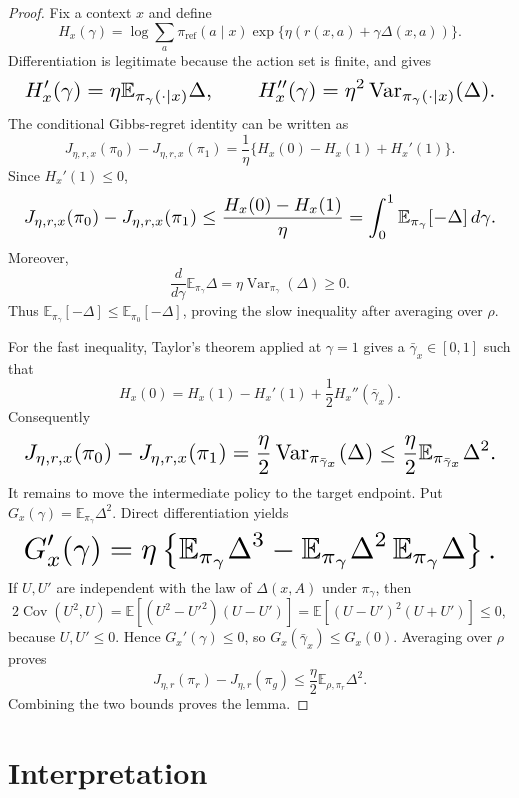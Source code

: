 \documentclass{article}
\begin{document}
\begin{proof}
Fix a context \(x\) and define
\[
H_x(\gamma)=\log\sum_a\pi_{\mathrm{ref}}(a\mid x)
\exp\{\eta(r(x,a)+\gamma\Delta(x,a))\}.
\]
Differentiation is legitimate because the action set is finite, and gives
\[
\makebox[\linewidth][c]{\resizebox{0.98\linewidth}{!}{\(\displaystyle H_x'(\gamma)=\eta\mathbb E_{\pi_\gamma(\cdot\mid x)}\Delta,
\qquad
H_x''(\gamma)=\eta^2\operatorname{Var}_{\pi_\gamma(\cdot\mid x)}(\Delta).\)}}
\]
The conditional Gibbs-regret identity can be written as
\[
J_{\eta,r,x}(\pi_0)-J_{\eta,r,x}(\pi_1)
=\frac1\eta\{H_x(0)-H_x(1)+H_x'(1)\}.
\]
Since \(H_x'(1)\le0\),
\[
\makebox[\linewidth][c]{\resizebox{0.98\linewidth}{!}{\(\displaystyle J_{\eta,r,x}(\pi_0)-J_{\eta,r,x}(\pi_1)
\le\frac{H_x(0)-H_x(1)}\eta
=\int_0^1\mathbb E_{\pi_\gamma}[-\Delta]\,d\gamma.\)}}
\]
Moreover,
\[
\frac{d}{d\gamma}\mathbb E_{\pi_\gamma}\Delta
=\eta\operatorname{Var}_{\pi_\gamma}(\Delta)\ge0.
\]
Thus \(\mathbb E_{\pi_\gamma}[-\Delta]\le\mathbb E_{\pi_0}[-\Delta]\), proving the slow inequality after averaging over \(\rho\).

For the fast inequality, Taylor's theorem applied at \(\gamma=1\) gives a \(\bar\gamma_x\in[0,1]\) such that
\[
H_x(0)=H_x(1)-H_x'(1)+\frac12H_x''(\bar\gamma_x).
\]
Consequently
\[
\makebox[\linewidth][c]{\resizebox{0.98\linewidth}{!}{\(\displaystyle J_{\eta,r,x}(\pi_0)-J_{\eta,r,x}(\pi_1)
=\frac\eta2\operatorname{Var}_{\pi_{\bar\gamma_x}}(\Delta)
\le\frac\eta2\mathbb E_{\pi_{\bar\gamma_x}}\Delta^2.\)}}
\]
It remains to move the intermediate policy to the target endpoint. Put \(G_x(\gamma)=\mathbb E_{\pi_\gamma}\Delta^2\). Direct differentiation yields
\[
\makebox[\linewidth][c]{\resizebox{0.98\linewidth}{!}{\(\displaystyle G_x'(\gamma)=\eta\left\{
\mathbb E_{\pi_\gamma}\Delta^3-\mathbb E_{\pi_\gamma}\Delta^2\,\mathbb E_{\pi_\gamma}\Delta
\right\}.\)}}
\]
If \(U,U'\) are independent with the law of \(\Delta(x,A)\) under \(\pi_\gamma\), then
\[
2\operatorname{Cov}(U^2,U)
=\mathbb E[(U^2-U'^2)(U-U')]
=\mathbb E[(U-U')^2(U+U')]\le0,
\]
because \(U,U'\le0\). Hence \(G_x'(\gamma)\le0\), so \(G_x(\bar\gamma_x)\le G_x(0)\). Averaging over \(\rho\) proves
\[
J_{\eta,r}(\pi_r)-J_{\eta,r}(\pi_g)
\le\frac\eta2\mathbb E_{\rho,\pi_r}\Delta^2.
\]
Combining the two bounds proves the lemma.
\end{proof}

\section{Interpretation}
\end{document}
